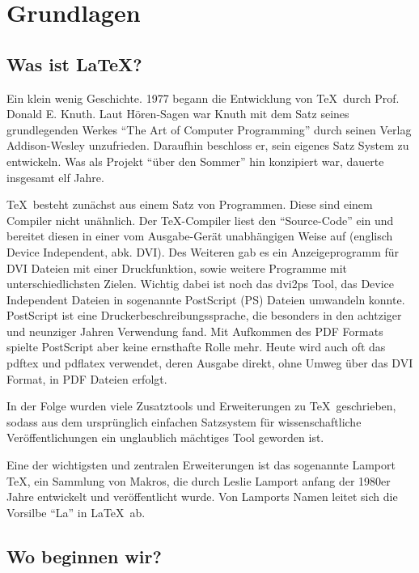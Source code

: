 
\chapter{Grundlagen}

\section{Was ist \LaTeX ?}

Ein klein wenig Geschichte. 1977 begann die Entwicklung von \TeX\ durch Prof. Donald E. Knuth. Laut Hören-Sagen war Knuth mit dem Satz seines grundlegenden Werkes "`The Art of Computer Programming"' durch seinen Verlag Ad\-di\-son-Wesley unzufrieden. Daraufhin beschloss er, sein eigenes Satz System zu entwickeln. Was als Projekt "`über den Sommer"' hin konzipiert war, dauerte insgesamt elf Jahre. 

\TeX\ besteht zunächst aus einem Satz von Programmen. Diese sind einem Compiler nicht unähnlich. Der \TeX-Compiler liest den "`Source-Code"' ein und bereitet diesen in einer vom Ausgabe-Gerät unabhängigen Weise auf (englisch Device Independent, abk. DVI). Des Weiteren gab es ein Anzeigeprogramm für DVI Dateien mit einer Druckfunktion, sowie weitere Programme mit unterschiedlichsten Zielen. Wichtig dabei ist noch das dvi2ps Tool, das Device Independent Dateien in sogenannte PostScript (PS) Dateien umwandeln konnte. PostScript ist eine Druckerbeschreibungssprache, die besonders in den achtziger und neunziger Jahren Verwendung fand. Mit Aufkommen des PDF Formats spielte PostScript aber keine ernsthafte Rolle mehr. Heute wird auch oft das pdftex und pdflatex verwendet, deren Ausgabe direkt, ohne Umweg über das DVI Format, in PDF Dateien erfolgt. 

In der Folge wurden viele Zusatztools und Erweiterungen zu \TeX\ geschrieben, sodass aus dem ursprünglich einfachen Satzsystem für wissenschaftliche Veröffentlichungen ein unglaublich mächtiges Tool geworden ist. 

Eine der wichtigsten und zentralen Erweiterungen ist das sogenannte Lamport \TeX, ein Sammlung von Makros, die durch Leslie Lamport anfang der 1980er Jahre entwickelt und veröffentlicht wurde. Von Lamports Namen leitet sich die Vorsilbe "`La"' in \LaTeX\ ab.

\section{Wo beginnen wir?}

